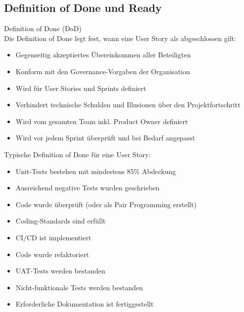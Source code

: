 \subsection{Definition of Done und Ready}

\begin{definition}{Definition of Done (DoD)}\\
    Die Definition of Done legt fest, wann eine User Story als abgeschlossen gilt:
    \begin{itemize}
        \item Gegenseitig akzeptiertes Übereinkommen aller Beteiligten
        \item Konform mit den Governance-Vorgaben der Organisation
        \item Wird für User Stories und Sprints definiert
        \item Verhindert technische Schulden und Illusionen über den Projektfortschritt
        \item Wird vom gesamten Team inkl. Product Owner definiert
        \item Wird vor jedem Sprint überprüft und bei Bedarf angepasst
    \end{itemize}
\end{definition}

\begin{example}
    Typische Definition of Done für eine User Story:
    \begin{itemize}
        \item Unit-Tests bestehen mit mindestens 85\% Abdeckung
        \item Ausreichend negative Tests wurden geschrieben
        \item Code wurde überprüft (oder als Pair Programming erstellt)
        \item Coding-Standards sind erfüllt
        \item CI/CD ist implementiert
        \item Code wurde refaktoriert
        \item UAT-Tests werden bestanden
        \item Nicht-funktionale Tests werden bestanden
        \item Erforderliche Dokumentation ist fertiggestellt
    \end{itemize}
\end{example}

